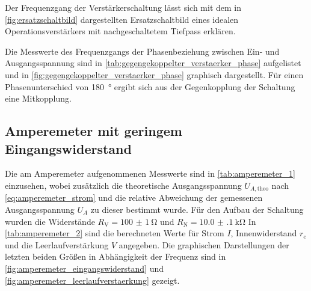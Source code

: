 














Der Frequenzgang der Verstärkerschaltung lässt sich mit dem in 
\cref{fig:ersatzschaltbild} dargestellten Ersatzschaltbild eines idealen 
Operationsverstärkers 
mit nachgeschaltetem Tiefpass erklären.



Die Messwerte des Frequenzgangs der Phasenbeziehung zwischen Ein- und 
Ausgangsspannung sind in \cref{tab:gegengekoppelter_verstaerker_phase}
aufgelistet und in \cref{fig:gegengekoppelter_verstaerker_phase} graphisch 
dargestellt. Für einen Phasenunterschied von \SI{180}{\degree} ergibt sich aus
der Gegenkopplung der Schaltung eine Mitkopplung.






\subsection{Amperemeter mit geringem Eingangswiderstand}

Die am Amperemeter aufgenommenen Messwerte sind in \cref{tab:amperemeter_1}
einzusehen, wobei zusätzlich die theoretische Ausgangsspannung 
$U_{A,\mathrm{theo}}$ nach \cref{eq:amperemeter_strom}
und die relative Abweichung der gemessenen Ausgangsspannung $U_A$ zu dieser 
bestimmt wurde. Für den Aufbau der Schaltung wurden die Widerstände
$R_{\mathrm{V}} = \SI{100(1)}{\ohm}$ und $R_{\mathrm{N}} = \SI{10.0(1)}{\kilo\ohm}$ 
In  \cref{tab:amperemeter_2} sind die berechneten Werte für Strom $I$, 
Innenwiderstand $r_e$ und die Leerlaufverstärkung $V$ angegeben. 
Die graphischen Darstellungen der letzten beiden Größen in Abhängigkeit der
Frequenz sind in 
\cref{fig:amperemeter_eingangswiderstand} und 
\cref{fig:amperemeter_leerlaufverstaerkung} gezeigt.

